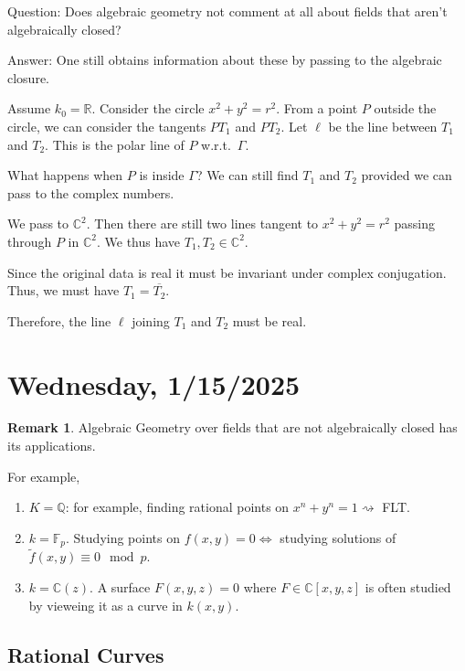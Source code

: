 \documentclass{article}
\theoremstyle{definition}
\newtheorem*{remark}{Remark}
\begin{document}
    Question: Does algebraic geometry not comment at all about fields that aren't algebraically closed?

    Answer: One still obtains information about these by passing to the algebraic closure.

    Assume \(k_0 = \mathbb{R}\). Consider the circle \(x^2 + y^2 = r^2\). From a point \(P\) outside the circle, we can consider the tangents \(PT_1\) and \(PT_2\). Let \(\ell\) be the line between \(T_1\) and \(T_2\). This is the polar line of \(P\) w.r.t.\ \(\Gamma\).
    
    What happens when \(P\) is inside \(\Gamma\)? We can still find \(T_1\) and \(T_2\) provided we can pass to the complex numbers.

    We pass to \(\mathbb{C}^2\). Then there are still two lines tangent to \(x^2 + y^2 = r^2\) passing through \(P\) in \(\mathbb{C}^2\). We thus have \(T_1, T_2 \in \mathbb{C}^2\).

    Since the original data is real it must be invariant under complex conjugation. Thus, we must have \(T_1 = \overline{T_2}\).

    Therefore, the line \(\ell\) joining \(T_1\) and \(T_2\) must be real.

    \section*{Wednesday, 1/15/2025}
    
    \begin{remark}
        Algebraic Geometry over fields that are not algebraically closed has its applications.

        For example,

        \begin{enumerate}[label=\arabic*)]
            \item \(K = \mathbb{Q}\): for example, finding rational points on  \(x^n + y^n = 1 \rightsquigarrow\) FLT.
            \item \(k = \mathbb{F}_p\). Studying points on \(f(x,y)=0 \iff\) studying solutions of \(\widetilde{f}(x,y)\equiv 0\mod p\).
            \item \(k = \mathbb{C}(z)\). A surface \(F(x,y,z)=0\) where \(F \in \mathbb{C} [x,y,z]\) is often studied by vieweing it as a curve in \(k(x,y)\). 
        \end{enumerate} 
    \end{remark}

    \subsection*{Rational Curves}
\end{document}
